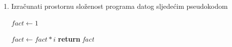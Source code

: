\begin{enumerate}
\begin{algorithm}[H]
	\begin{algorithmic}[1]
		
		\State  $ans \gets 0$
		\State $ans \gets ans+arr[i]$
		\EndFor
		\State ispiši $ans$
		\EndProcedure
	\end{algorithmic}
\end{algorithm}



\item Izračunati prostornu složenost programa datog sljedećim pseudokodom
 
\begin{algorithm}[H]
	\begin{algorithmic}[1]
	  	\State $fact \gets 1$
	  	   
	  	   \State	$fact \gets fact * i$
	  	 \EndFor
	  	\State \textbf{return} \textit{fact}
	  \EndProcedure
	\end{algorithmic}
\end{algorithm}
 


\end{enumerate}